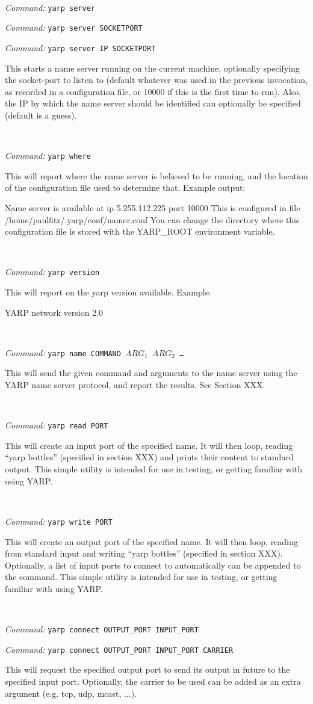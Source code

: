 \documentclass[a4]{article}
\newenvironment{packed_itemize}{
\begin{itemize}
  \renewcommand{\labelitemi}{$\triangleright$}
  \setlength{\itemsep}{1pt}
  \setlength{\parskip}{0pt}
  \setlength{\parsep}{0pt}
}{\end{itemize}}
\newcommand{\newusage}{\ \\\noindent\makebox[\textwidth]{\hrulefill}}
\newcommand{\usage}[1]{ \begin{packed_itemize} \item {\it Command:} {\tt #1} \end{packed_itemize}}
\begin{document}
\newusage{}
\usage{yarp server}
\usage{yarp server SOCKETPORT}
\usage{yarp server IP SOCKETPORT}
%
This starts a name server running on the current machine, optionally
specifying the socket-port to listen to (default whatever was used in
the previous invocation, as recorded in a configuration file, or 10000
if this is the first time to run).
%
Also, the IP by which the name server should be identified can
optionally be specified (default is a guess).

\newusage{}
\usage{yarp where}
%
This will report where the name server is believed to be running,
and the location of the configuration file used to determine that.
Example output:

\begin{code}
Name server is available at ip 5.255.112.225 port 10000
This is configured in file /home/paulfitz/.yarp/conf/namer.conf
You can change the directory where this configuration file is stored
with the YARP\_ROOT environment variable.
\end{code}

\newusage{}
\usage{yarp version}
%
This will report on the yarp version available.  Example:

\begin{code}
YARP network version 2.0
\end{code}

\newusage{}
\usage{yarp name COMMAND $ARG_1$ $ARG_2$ \ldots}
%
This will send the given command and arguments to the name server
using the YARP name server protocol, and report the results.
See Section XXX.
%

\newusage{}
\usage{yarp read PORT}
%
This will create an input port of the specified name.  It will
then loop, 
reading ``yarp bottles'' (specified in section XXX) and prints their content
to standard output.  This simple utility is intended for use in testing, or
getting familiar with using YARP.

\newusage{}
\usage{yarp write PORT}
%
This will create an output port of the specified name.  It will then
loop, reading
from standard input and writing ``yarp bottles'' (specified in section
XXX).  Optionally, a list of input ports to connect to automatically
can be appended to the command.  This simple utility is intended for use 
in testing, or
getting familiar with using YARP.

\newusage{}
\usage{yarp connect OUTPUT\_PORT INPUT\_PORT}
\usage{yarp connect OUTPUT\_PORT INPUT\_PORT CARRIER}
%
This will request the specified output port to send its output in 
future to the specified input port.
Optionally, the carrier to be used can be added as an extra argument
(e.g. tcp, udp, mcast, ...).
\end{document}
